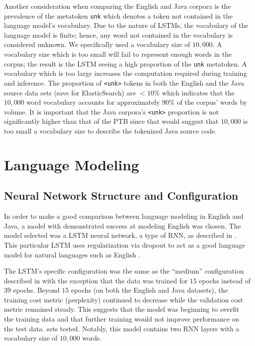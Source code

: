 \documentclass[runningheads,a4paper]{llncs}
\begin{document}
Another consideration when comparing the English and Java corpora is the
prevalence of the metatoken \texttt{unk} which denotes a token not contained
in the language model's vocabulary.
Due to the nature of LSTMs, the vocabulary of the language model is finite;
hence, any word not contained in the vocabulary is considered unknown.
We specifically used a vocabulary size of $10,000$. A vocabulary size which
is too small will fail to represent enough words in the corpus; the result
is the LSTM seeing a high proportion of the \texttt{unk} metatoken. A
vocabulary which is too large increases the computation required during
training and inference.
The proportion of \texttt{<unk>} tokens in both the English and the Java
source data sets (save for ElasticSearch) are $<10\%$ which indicates that
the $10,000$ word vocabulary accounts for approximately $90\%$ of the corpus'
words by volume. It is important that the Java corpora's \texttt{<unk>}
proportion is not significantly higher than that of the PTB since
that would suggest that $10,000$ is too small a vocabulary size to describe
the tokenized Java source code.

\section{Language Modeling}
\label{language-modeling}

\subsection{Neural Network Structure and Configuration}

In order to make a good comparison between language modeling in English
and Java, a model with demonstrated success at modeling English was
chosen. The model selected was a LSTM neural
network, a type of RNN, as described in
\citet{LSTMArticle}. This particular LSTM uses regularization via 
dropout to act as a good language model for natural languages
such as English \cite{LSTMArticle}.


The LSTM's specific configuration was the same as the ``medium''
configuration described in \citet{LSTMArticle} with the exception
that the data was trained for $15$ epochs instead of $39$ epochs.
Beyond $15$ epochs (on both the English and Java datasets), the 
training cost metric (perplexity) continued to decrease while the
validation cost metric remained steady. This suggests that the model
was beginning to overfit the training data and that further training
would not improve performance on the test data.
sets tested. Notably, this model contains two RNN layers with a vocabulary
size of $10,000$ words.
\end{document}
